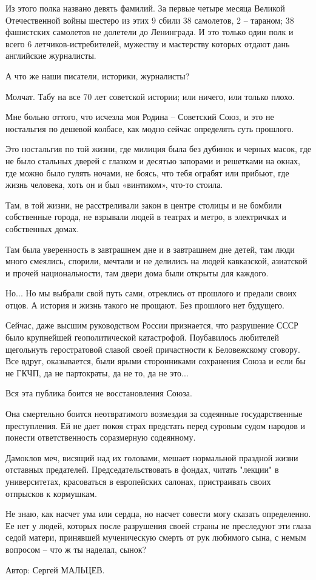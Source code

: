 Из этого полка названо девять фамилий. За первые четыре месяца Великой
Отечественной войны шестеро из этих 9 сбили 38 самолетов, 2 – тараном; 38
фашистских самолетов не долетели до Ленинграда. И это только один полк и всего
6 летчиков-истребителей, мужеству и мастерству которых отдают дань английские
журналисты.

А что же наши писатели, историки, журналисты?

Молчат. Табу на все 70 лет советской истории; или ничего, или только плохо.

Мне больно оттого, что исчезла моя Родина – Советский Союз, и это не ностальгия
по дешевой колбасе, как модно сейчас определять суть прошлого.

Это ностальгия по той жизни, где милиция была без дубинок и черных масок, где
не было стальных дверей с глазком и десятью запорами и решетками на окнах, где
можно было гулять ночами, не боясь, что тебя ограбят или прибьют, где жизнь
человека, хоть он и был «винтиком», что-то стоила.

Там, в той жизни, не расстреливали закон в центре столицы и не бомбили
собственные города, не взрывали людей в театрах и метро, в электричках и
собственных домах.

Там была уверенность в завтрашнем дне и в завтрашнем дне детей, там люди много
смеялись, спорили, мечтали и не делились на людей кавказской, азиатской и
прочей национальности, там двери дома были открыты для каждого.

Но... Но мы выбрали свой путь сами, отреклись от прошлого и предали своих
отцов. А история и жизнь такого не прощают. Без прошлого нет будущего.

Сейчас, даже высшим руководством России признается, что разрушение СССР было
крупнейшей геополитической катастрофой. Поубавилось любителей щегольнуть
геростратовой славой своей причастности к Беловежскому сговору. Все вдруг,
оказывается, были ярыми сторонниками сохранения Союза и если бы не ГКЧП, да не
партократы, да не то, да не это...

Вся эта публика боится не восстановления Союза.

Она смертельно боится неотвратимого возмездия за содеянные государственные
преступления. Ей не дает покоя страх предстать перед суровым судом народов и
понести ответственность соразмерную содеянному.

Дамоклов меч, висящий над их головами, мешает нормальной праздной жизни
отставных предателей. Председательствовать в фондах, читать "лекции" в
университетах, красоваться в европейских салонах, пристраивать своих отпрысков
к кормушкам.

Не знаю, как насчет ума или сердца, но насчет совести могу сказать определенно.
Ее нет у людей, которых после разрушения своей страны не преследуют эти глаза
седой матери, принявшей мученическую смерть от рук любимого сына, с немым
вопросом – что ж ты наделал, сынок?

Автор: Сергей МАЛЬЦЕВ.


